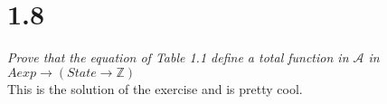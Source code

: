 \documentclass[
10pt, %
a4paper, %
oneside, %
headinclude,footinclude, %
BCOR5mm, %
]{scrartcl}
\newcommand{\exercise}[3]{\section{#1}\emph{#2}
	\vspace{10pt}
	\\
	#3}
\begin{document}
\maketitle 
\setcounter{tocdepth}{3} 
\setcounter{secnumdepth}{0}
\tableofcontents 

\newpage 

\exercise{1.8}
{Prove that the equation of Table 1.1 define a total function in $\mathcal{A}$ in $Aexp \rightarrow (State \rightarrow \mathbb{Z})$}
{
 This is the solution of the exercise and is pretty cool.
	
}
\end{document}
